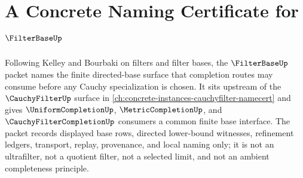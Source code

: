 \chapter{A Concrete Naming Certificate for $\FilterBaseUp$}
\label{ch:concrete-instances-filterbase-namecert}

Following Kelley and Bourbaki on filters and filter bases, the $\FilterBaseUp$ packet names the finite directed-base surface that completion routes may consume before any Cauchy specialization is chosen. It sits upstream of the $\CauchyFilterUp$ surface in \autoref{ch:concrete-instances-cauchyfilter-namecert} and gives $\UniformCompletionUp$, $\MetricCompletionUp$, and $\CauchyFilterCompletionUp$ consumers a common finite base interface. The packet records displayed base rows, directed lower-bound witnesses, refinement ledgers, transport, replay, provenance, and local naming only; it is not an ultrafilter, not a quotient filter, not a selected limit, and not an ambient completeness principle.

